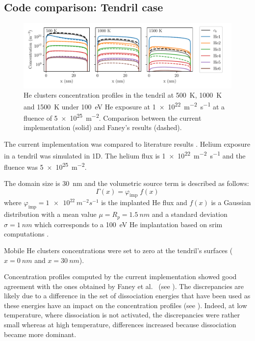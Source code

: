 \subsection{Code comparison: Tendril case} 

\begin{figure}
    \centering
    \includegraphics[width=\linewidth]{Figures/Chapter4/profiles_tendrils.pdf}
    \caption{He clusters concentration profiles in the \gls{tendril} at \SI{500}{K}, \SI{1000}{K} and \SI{1500}{K} under \SI{100}{eV} He exposure at \SI{1e22}{m^{-2}.s^{-1}} at a fluence of \SI{5e25}{m^{-2}}. Comparison between the current implementation (solid) and Faney's results \cite{faney_spatially_2015} (dashed).}
\end{figure}

The current implementation was compared to literature results \cite{faney_spatially_2015}.
Helium exposure in a \gls{tendril} was simulated in 1D.
The helium flux is \SI{1e22}{m^{-2}.s^{-1}} and the fluence was \SI{5e25}{m^{-2}}.

The domain size is \SI{30}{nm} and the volumetric source term is described as follows:
\begin{equation}
    \Gamma(x) = \varphi_\mathrm{imp} \; f(x) 
\end{equation}
where $\varphi_\mathrm{imp} = \SI{1e22}{m^{-2} s^{-1}}$ is the implanted He flux and $f(x)$ is a Gaussian distribution with a mean value $\mu = R_p = \SI{1.5}{nm}$ and a standard deviation $\sigma = \SI{1}{nm}$ which corresponds to a \SI{100}{eV} He implantation based on \gls{srim} computations .

Mobile He clusters concentrations were set to zero at the \gls{tendril}'s surfaces ($x=\SI{0}{nm}$ and $x=\SI{30}{nm}$).

Concentration profiles computed by the current implementation showed good agreement with the ones obtained by Faney et al.\ \cite{faney_spatially_2015} (see ).
The discrepancies are likely due to a difference in the set of dissociation energies that have been used as these energies have an impact on the concentration profiles (see ).
Indeed, at low temperature, where dissociation is not activated, the discrepancies were rather small whereas at high temperature, differences increased because dissociation became more dominant.

